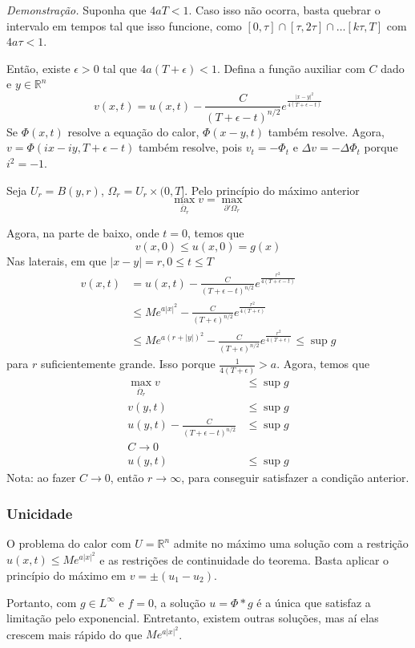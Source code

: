 \documentclass[11pt]{article}
\newcommand{\Rn}{{\mathbb{R}^n}}
\newcommand{\p}{\partial}
\newcommand{\e}{\epsilon}
\newcommand{\parentesis}[1]{\left(#1\right)}
\begin{document}
\textit{Demonstração.} Suponha que \(4aT<1\). Caso isso não ocorra, basta quebrar o intervalo em tempos tal que isso funcione, como \([0, \tau] \cap [\tau, 2\tau] \cap \ldots [k\tau, T]\) com \(4a\tau < 1\).

Então, existe \(\e>0\) tal que \(4a(T+\e)<1\). Defina a função auxiliar com \(C\) dado e \(y \in \Rn\) \[v(x,t) = u(x,t) - \frac{C}{\parentesis{T+\e-t}^{n/2}} e^{\frac{|x-y|^2}{4(T+\e-t)}}\] 
Se \(\Phi(x,t)\) resolve a equação do calor, \(\Phi(x-y,t)\) também resolve. Agora, \(v=\Phi(ix-iy,T+\e-t)\) também resolve, pois \(v_t = -\Phi_t\) e \(\Delta v = - \Delta \Phi_t \) porque \(i^2 =-1\).


Seja \(U_r=B(y,r)\), \(\Omega_r = U_r \times (0,T]\). Pelo princípio do máximo anterior \[\max_{\overline{\Omega}_r}v = \max_{\p'\Omega_r}\]

Agora, na parte de baixo, onde \(t=0\), temos que \[v(x,0) \leq u(x,0) = g(x)\]
Nas laterais, em que \(|x-y|=r, 0 \leq t \leq T\) \begin{align*}
	v(x,t) &= u(x,t) - \frac{C}{\parentesis{T+\e-t}^{n/2}} e^{\frac{r^2}{4(T+\e-t)}} \\
	&\leq Me^{a|x|^2} - \frac{C}{\parentesis{T+\e}^{n/2}} e^{\frac{r^2}{4(T+\e)}}\\
	&\leq Me^{a(r+|y|)^2} - \frac{C}{\parentesis{T+\e}^{n/2}} e^{\frac{r^2}{4(T+\e)}} \leq \sup g 
\end{align*}
para \(r\) suficientemente grande. Isso porque \(\frac{1}{4(T+\e)} > a\). Agora, temos que \begin{align*}
	\max_{\overline{\Omega}_r}v &\leq \sup g \\
	v(y,t) &\leq \sup g \\
	u(y,t) - \frac{C}{\parentesis{T+\e-t}^{n/2}} &\leq \sup g\\
	C \rightarrow 0& \\
	u(y,t) &\leq \sup g
\end{align*}
Nota: ao fazer \(C \rightarrow 0\), então \(r \rightarrow \infty\), para conseguir satisfazer a condição anterior.

\subsubsection*{Unicidade} 
O problema do calor com \(U= \Rn\) admite no máximo uma solução com a restrição \(u(x,t) \leq M e^{a |x|^2}\) e as restrições de continuidade do teorema. Basta aplicar o princípio do máximo em \(v=\pm(u_1-u_2)\).

Portanto, com \(g\in L^\infty\) e \(f=0\), a solução \(u=\Phi * g\) é a única que satisfaz a limitação pelo exponencial. Entretanto, existem outras soluções, mas aí elas crescem mais rápido do que \(Me^{a|x|^2}\).
\end{document}
